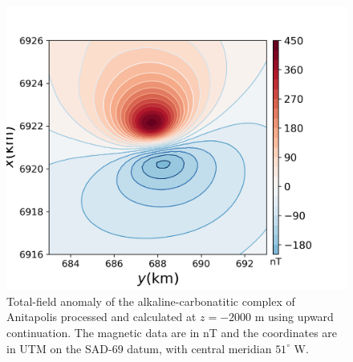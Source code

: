 \begin{figure}
    \centering
    \includegraphics[scale=.5]{figures/real_updata.png}
    \caption{Total-field anomaly of the alkaline-carbonatitic complex of Anitapolis processed and calculated at $z=-2000$ m using upward continuation. The magnetic data are in nT and the coordinates are in UTM on the SAD-69 datum, with central meridian $ 51^\circ $ W.
}
    \label{fig:real_data}
\end{figure}

